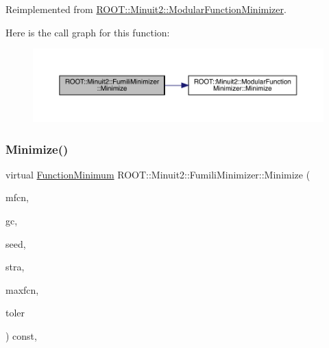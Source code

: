 Reimplemented from \mbox{\hyperlink{classROOT_1_1Minuit2_1_1ModularFunctionMinimizer_ac2b4ce9fa735f5014f610fd0374c58e4}{R\+O\+O\+T\+::\+Minuit2\+::\+Modular\+Function\+Minimizer}}.

Here is the call graph for this function\+:
\nopagebreak
\begin{figure}[H]
\begin{center}
\leavevmode
\includegraphics[width=350pt]{db/da1/classROOT_1_1Minuit2_1_1FumiliMinimizer_ace396e586a17ad934f18b32c8ddd054a_cgraph}
\end{center}
\end{figure}
\mbox{\label{classROOT_1_1Minuit2_1_1FumiliMinimizer_ace396e586a17ad934f18b32c8ddd054a}} 
\subsubsection{\texorpdfstring{Minimize()}{Minimize()}\hspace{0.1cm}{\footnotesize\ttfamily [22/22]}}
{\footnotesize\ttfamily virtual \mbox{\hyperlink{classROOT_1_1Minuit2_1_1FunctionMinimum}{Function\+Minimum}} R\+O\+O\+T\+::\+Minuit2\+::\+Fumili\+Minimizer\+::\+Minimize (\begin{DoxyParamCaption}\item[{const \mbox{\hyperlink{classROOT_1_1Minuit2_1_1MnFcn}{Mn\+Fcn}} \&}]{mfcn,  }\item[{const \mbox{\hyperlink{classROOT_1_1Minuit2_1_1GradientCalculator}{Gradient\+Calculator}} \&}]{gc,  }\item[{const \mbox{\hyperlink{classROOT_1_1Minuit2_1_1MinimumSeed}{Minimum\+Seed}} \&}]{seed,  }\item[{const \mbox{\hyperlink{classROOT_1_1Minuit2_1_1MnStrategy}{Mn\+Strategy}} \&}]{stra,  }\item[{unsigned int}]{maxfcn,  }\item[{double}]{toler }\end{DoxyParamCaption}) const\hspace{0.3cm}{\ttfamily [inline]}, {\ttfamily [virtual]}}



